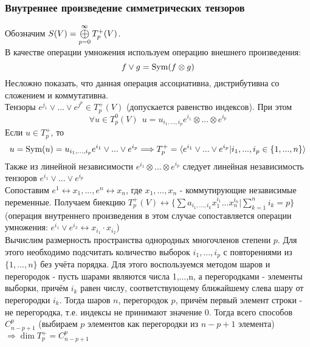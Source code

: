 \subsubsection*{Внутреннее произведение симметрических тензоров}
Обозначим $S(V) = \circledplus \limits_{p = 0}^\infty T_p^+(V)$.\\
В качестве операции умножения используем операцию внешнего произведения:
\[f \vee g = \textup{Sym}(f \otimes g)\]
Несложно показать, что данная операция ассоциативна, дистрибутивна со сложением и коммутативна.\\
Тензоры $e^{j_1}\vee...\vee e^{j^p} \in T_p^+(V)$ (допускается равенство индексов). При этом
\[\forall u \in T_p^0(V) \ \ u = u_{i_1,...,i_p}e^{i_1}\otimes...\otimes e^{i_p}\]
Если $u \in T_p^+$, то
\[u = \textup{Sym}(u) = u_{i_1,...,i_p}e^{i_1}\vee...\vee e^{i_p} \Longrightarrow T_p^+ = \langle e^{i_1}\vee...\vee e^{i_p} | i_1,...,i_p \in \{1,...,n\}\rangle\]
Также из линейной независимости $e^{i_1}\otimes...\otimes e^{i_p}$ следует линейная независимость тензоров $e^{i_1}\vee...\vee e^{i_p}$\\
Сопоставим $e^1 \leftrightarrow x_1,..., e^n \leftrightarrow x_n$, где $x_1,...,x_n$ - коммутирующие независимые переменные. Получаем биекцию $T_p^+(V) \leftrightarrow \{\sum a_{i_1,...,i_k}x_1^{i_1}...x_n^{i_n} | \sum \limits_{k=1}^n i_k = p\}$ (операция внутреннего произведения в этом случае сопоставляется операции умножения: $e^{i_1} \vee e^{i_2} \leftrightarrow x_{i_1}\cdot x_{i_2}$)\\
Вычислим размерность пространства однородных многочленов степени $p$. Для этого необходимо подсчитать количество выборок $i_1,...,i_p$ с повторениями из $\{1,...,n\}$ без учёта порядка. Для этого воспользуемся методом шаров и перегородок - пусть шарами являются числа 1,...,n, а перегородками - элементы выборки, причём $i_k$ равен числу, соответствующему ближайшему слева шару от перегородки $i_k$. Тогда шаров $n$, перегородок $p$, причём первый элемент строки - не перегородка, т.е. индексы не принимают значение 0. Тогда всего способов $C_{n-p+1}^p$ (выбираем $p$ элементов как перегородки из $n-p+1$ элемента) $\Longrightarrow \dim T_p^+ = C_{n-p+1}^p$  
